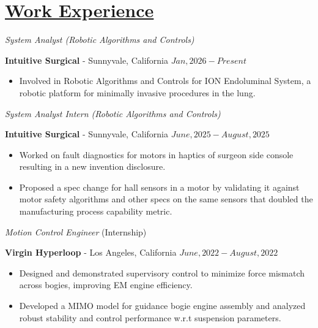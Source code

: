 \section*{\underline{Work Experience}}
\noindent \textit{System Analyst (Robotic Algorithms and Controls)}

\textbf{Intuitive Surgical} - Sunnyvale, California \hfill $Jan, 2026  - Present$

\begin{itemize}
        \item Involved in Robotic Algorithms and Controls for ION Endoluminal System, a robotic platform for minimally invasive procedures in the lung.
\end{itemize}

\medskip

\noindent \textit{System Analyst Intern (Robotic Algorithms and Controls)}

\textbf{Intuitive Surgical} - Sunnyvale, California \hfill $June, 2025  - August, 2025$

\begin{itemize}
        \item Worked on fault diagnostics for motors in haptics of surgeon side console resulting in a new invention disclosure.
        \item Proposed a spec change for hall sensors in a motor by validating it against motor safety algorithms and other specs on the same sensors that doubled the manufacturing process capability metric.
\end{itemize}

\medskip


\noindent \textit{Motion Control Engineer } (Internship)

\textbf{Virgin Hyperloop} - Los Angeles, California \hfill $June, 2022  - August, 2022$

\begin{itemize}
        \item Designed and demonstrated supervisory control to minimize force mismatch across bogies, improving EM engine efficiency.
        \item Developed a MIMO model for guidance bogie engine assembly and analyzed robust stability and control performance w.r.t suspension parameters.
\end{itemize}

